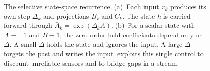 \begin{figure}[htbp]
\vspace{1mm}
\caption[The selective state-space recurrence and the role of the step $\Delta$]{The
selective state-space recurrence. (a)~Each input $x_k$ produces its own step
$\Delta_k$ and projections $B_k$ and $C_k$. The state $h$ is carried forward
through $\bar A_k = \exp(\Delta_k A)$. (b)~For a scalar state with $A=-1$
and $B=1$, the zero-order-hold coefficients depend only on $\Delta$. A small
$\Delta$ holds the state and ignores the input. A large $\Delta$ forgets the
past and writes the input. \method{} exploits this single control to
discount unreliable sensors and to bridge gaps in a stream.}
\label{fig:ssm}
\end{figure}
